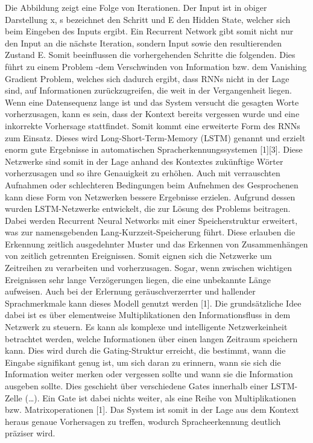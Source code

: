 Die Abbildung zeigt eine Folge von Iterationen. Der Input ist in obiger Darstellung x, s bezeichnet den Schritt und E den Hidden State, welcher sich beim Eingeben des Inputs ergibt. Ein Recurrent Network gibt somit nicht nur den Input an die nächste Iteration, sondern Input sowie den resultierenden Zustand E. Somit beeinflussen die vorhergehenden Schritte die folgenden. Dies führt zu einem Problem -dem Verschwinden von Information bzw. dem Vanishing Gradient Problem, welches sich dadurch ergibt, dass RNNs nicht in der Lage sind, auf Informationen zurückzugreifen, die weit in der Vergangenheit liegen.
Wenn eine Datensequenz lange ist und das System versucht die gesagten Worte vorherzusagen, kann es sein, dass der Kontext bereits vergessen wurde und eine inkorrekte Vorhersage stattfindet. Somit kommt eine erweiterte Form des RNNs zum Einsatz. Dieses wird Long-Short-Term-Memory (LSTM) genannt und erzielt enorm gute Ergebnisse in automatischen Spracherkennungssystemen [1][3]. 
Diese Netzwerke sind somit in der Lage anhand des Kontextes zukünftige Wörter vorherzusagen und so ihre Genauigkeit zu erhöhen.  Auch mit verrauschten Aufnahmen oder schlechteren Bedingungen beim Aufnehmen des Gesprochenen kann diese Form von Netzwerken bessere Ergebnisse erzielen. 
Aufgrund dessen wurden LSTM-Netzwerke entwickelt, die zur Lösung des Problems beitragen. Dabei werden Recurrent Neural Networks mit einer Speicherstruktur erweitert, was zur namensgebenden Lang-Kurzzeit-Speicherung führt. Diese erlauben die Erkennung zeitlich ausgedehnter Muster und das Erkennen von Zusammenhängen von zeitlich getrennten Ereignissen. Somit eignen sich die Netzwerke um Zeitreihen zu verarbeiten und vorherzusagen. Sogar, wenn zwischen wichtigen Ereignissen sehr lange Verzögerungen liegen, die eine unbekannte Länge aufweisen. Auch bei der Erlernung geräuschverzerrter und hallender Sprachmerkmale kann dieses Modell genutzt werden [1]. 
Die grundsätzliche Idee dabei ist es über elementweise Multiplikationen den Informationsfluss in dem Netzwerk zu steuern. Es kann als komplexe und intelligente Netzwerkeinheit betrachtet werden, welche Informationen über einen langen Zeitraum speichern kann. Dies wird durch die Gating-Struktur erreicht, die bestimmt, wann die Eingabe signifikant genug ist, um sich daran zu erinnern, wann sie sich die Information weiter merken oder vergessen sollte und wann sie die Information ausgeben sollte. Dies geschieht über verschiedene Gates innerhalb einer LSTM-Zelle (…). Ein Gate ist dabei nichts weiter, als eine Reihe von Multiplikationen bzw. Matrixoperationen [1].
Das System ist somit in der Lage aus dem Kontext heraus genaue Vorhersagen zu treffen, wodurch Spracheerkennung deutlich präziser wird. 
